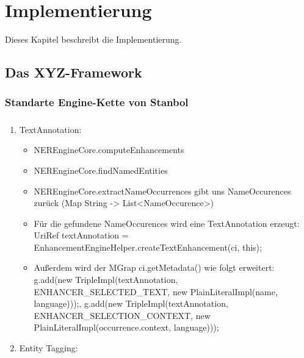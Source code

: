 \chapter{Implementierung}
\label{sec:Implementierung}
Dieses Kapitel beschreibt die Implementierung.

\section{Das XYZ-Framework}
\subsection{Standarte Engine-Kette von Stanbol}
\paragraph{}
\begin{enumerate}
\item TextAnnotation:
\begin{itemize}
\item NEREngineCore.computeEnhancements
\item NEREngineCore.findNamedEntities
\item NEREngineCore.extractNameOccurrences gibt uns NameOccurences zurück (Map String -> List<NameOccurence>)
\item Für die gefundene NameOccurences wird eine TextAnnotation erzeugt: UriRef textAnnotation = EnhancementEngineHelper.createTextEnhancement(ci, this);
\item Außerdem wird der MGrap ci.getMetadata() wie folgt erweitert: g.add(new TripleImpl(textAnnotation, ENHANCER_SELECTED_TEXT, new PlainLiteralImpl(name, language)));, 
                       g.add(new TripleImpl(textAnnotation, ENHANCER_SELECTION_CONTEXT, new PlainLiteralImpl(occurrence.context, language))); 
                       
\end{itemize}
\item Entity Tagging:
\begin{itemize}

\end{itemize}
\end{enumerate}

